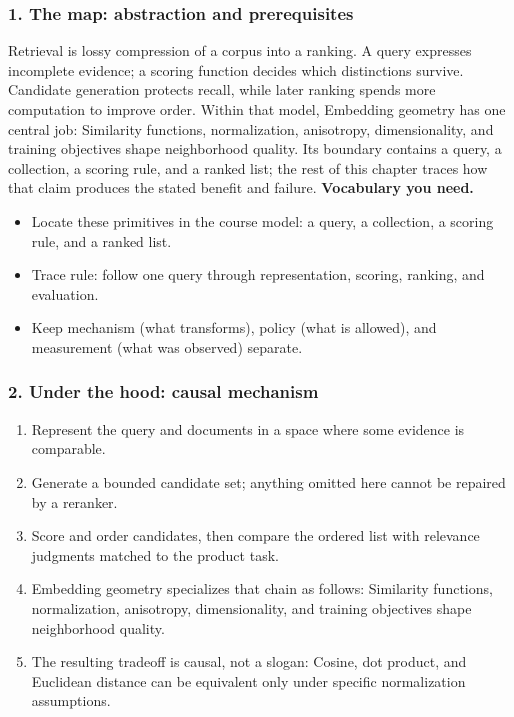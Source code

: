 \subsubsection*{1. The map: abstraction and prerequisites}
Retrieval is lossy compression of a corpus into a ranking. A query expresses incomplete evidence; a scoring function decides which distinctions survive. Candidate generation protects recall, while later ranking spends more computation to improve order.
Within that model, Embedding geometry has one central job: Similarity functions, normalization, anisotropy, dimensionality, and training objectives shape neighborhood quality. Its boundary contains a query, a collection, a scoring rule, and a ranked list; the rest of this chapter traces how that claim produces the stated benefit and failure.
\textbf{Vocabulary you need.}\begin{itemize}
\item Locate these primitives in the course model: a query, a collection, a scoring rule, and a ranked list.
\item Trace rule: follow one query through representation, scoring, ranking, and evaluation.
\item Keep mechanism (what transforms), policy (what is allowed), and measurement (what was observed) separate.
\end{itemize}
\subsubsection*{2. Under the hood: causal mechanism}\begin{enumerate}
\item Represent the query and documents in a space where some evidence is comparable.
\item Generate a bounded candidate set; anything omitted here cannot be repaired by a reranker.
\item Score and order candidates, then compare the ordered list with relevance judgments matched to the product task.
\item Embedding geometry specializes that chain as follows: Similarity functions, normalization, anisotropy, dimensionality, and training objectives shape neighborhood quality.
\item The resulting tradeoff is causal, not a slogan: Cosine, dot product, and Euclidean distance can be equivalent only under specific normalization assumptions.
\end{enumerate}
